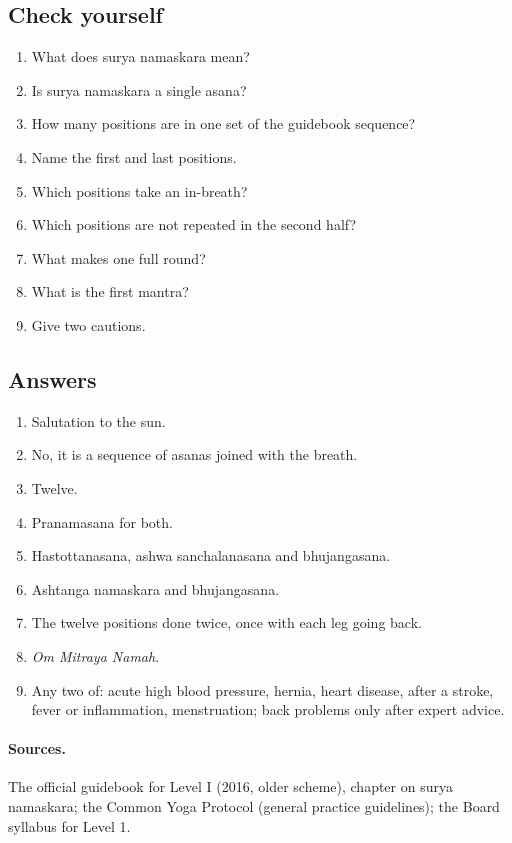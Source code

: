 \subsection*{Check yourself}
\begin{enumerate}
\item What does surya namaskara mean?
\item Is surya namaskara a single asana?
\item How many positions are in one set of the guidebook sequence?
\item Name the first and last positions.
\item Which positions take an in-breath?
\item Which positions are not repeated in the second half?
\item What makes one full round?
\item What is the first mantra?
\item Give two cautions.
\end{enumerate}

\subsection*{Answers}
\begin{enumerate}
\item Salutation to the sun.
\item No, it is a sequence of asanas joined with the breath.
\item Twelve.
\item Pranamasana for both.
\item Hastottanasana, ashwa sanchalanasana and bhujangasana.
\item Ashtanga namaskara and bhujangasana.
\item The twelve positions done twice, once with each leg going back.
\item \emph{Om Mitraya Namah}.
\item Any two of: acute high blood pressure, hernia, heart disease, after a stroke, fever or inflammation, menstruation; back problems only after expert advice.
\end{enumerate}

\paragraph{Sources.} The official guidebook for Level I (2016, older scheme), chapter on surya namaskara; the Common Yoga Protocol (general practice guidelines); the Board syllabus for Level 1.
